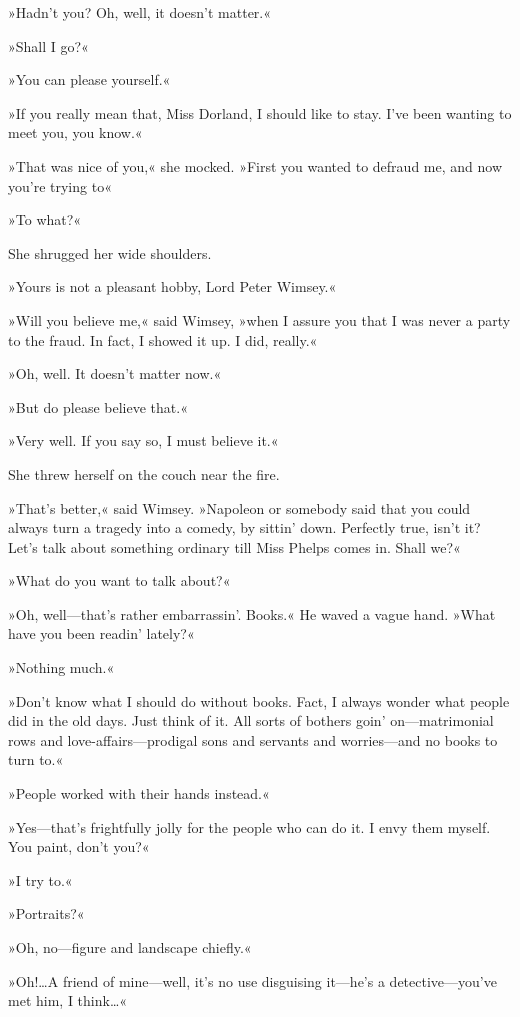 »Hadn't you? Oh, well, it doesn't matter.«

»Shall I go?«

»You can please yourself.«

»If you really mean that, Miss Dorland, I should like to stay. I've been wanting to meet you, you know.«

»That was nice of you,« she mocked. »First you wanted to defraud me, and now you're trying to\longdash«

»To what?«

She shrugged her wide shoulders.

»Yours is not a pleasant hobby, Lord Peter Wimsey.«

»Will you believe me,« said Wimsey, »when I assure you that I was never a party to the fraud. In fact, I showed it up. I did, really.«

»Oh, well. It doesn't matter now.«

»But do please believe that.«

»Very well. If you say so, I must believe it.«

She threw herself on the couch near the fire.

»That's better,« said Wimsey. »Napoleon or somebody said that you could always turn a tragedy into a comedy, by sittin' down. Perfectly true, isn't it? Let's talk about something ordinary till Miss Phelps comes in. Shall we?«

»What do you want to talk about?«

»Oh, well—that's rather embarrassin'. Books.« He waved a vague hand. »What have you been readin' lately?«

»Nothing much.«

»Don't know what I should do without books. Fact, I always wonder what people did in the old days. Just think of it. All sorts of bothers goin' on—matrimonial rows and love-affairs—prodigal sons and servants and worries—and no books to turn to.«

»People worked with their hands instead.«

»Yes—that's frightfully jolly for the people who can do it. I envy them myself. You paint, don't you?«

»I try to.«

»Portraits?«

»Oh, no—figure and landscape chiefly.«

»Oh!\dots A friend of mine—well, it's no use disguising it—he's a detective—you've met him, I think\dots«

